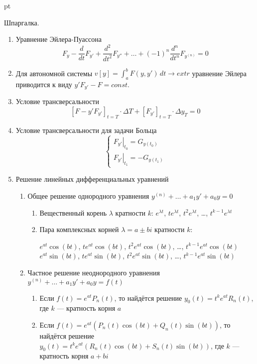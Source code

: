 \documentclass[pdftex,12pt,a4paper]{article}
\begin{document}
 pt %

Шпаргалка.

\begin{enumerate}
\item Уравнение Эйлера-Пуассона
\[
F_y-\frac{d}{dt}F_{y'}+\frac{d^2}{dt^2}F_{y''}+\ldots+(-1)^n\frac{d^n}{dt^n}F_{y^{(n)}}=0
\]

\item Для автономной системы $v[y]=\int_a^b F(y,y')\, dt \to extr$ уравнение Эйлера приводится к виду $y'F_{y'}-F=const$.

\item Условие трансверсальности 
\[
[F-y'F_{y'}]_{t=T}\cdot \Delta T + [F_{y'}]_{t=T}\cdot \Delta y_T=0
\]

\item Условие трансверсальности для задачи Больца
\[
\begin{cases}
\left. F_{y'}\right|_{t_0}=G_{y(t_0)} \\
\left. F_{y'}\right|_{t_1}=-G_{y(t_1)}
\end{cases}
\]

\item Решение линейных дифференциальных уравнений

\begin{enumerate}
\item Общее решение однородного уравнения $y^{(n)}+\ldots+a_1 y'+a_0 y=0$
\begin{enumerate}
\item Вещественный корень $\lambda$ кратности $k$: $e^{\lambda t}$, $te^{\lambda t}$, $t^2e^{\lambda t}$, \ldots, $t^{k-1}e^{\lambda t}$
\item Пара комплексных корней $\lambda=a\pm bi$  кратности $k$:

$e^{at}\cos(bt)$, $te^{at}\cos(bt)$, $t^2e^{at}\cos(bt)$, \ldots, $t^{k-1}e^{at}\cos(bt)$ \\
$e^{at}\sin(bt)$, $te^{at}\sin(bt)$, $t^2e^{at}\sin(bt)$, \ldots, $t^{k-1}e^{at}\sin(bt)$
\end{enumerate}
\item Частное решение неоднородного уравнения $y^{(n)}+\ldots+a_1 y'+a_0 y=f(t)$
\begin{enumerate}
\item Если $f(t)=e^{at}P_n(t)$, то найдётся решение $y_0(t)=t^k e^{at} R_n(t)$, где $k$ --- кратность корня $a$
\item Если $f(t)=e^{at}(P_n(t)\cos(bt)+Q_n(t)\sin(bt))$, то найдётся решение $y_0(t)=t^k e^{at}(R_n(t)\cos(bt)+S_n(t)\sin(bt))$, где $k$ --- кратность корня $a+bi$
\end{enumerate}
\end{enumerate}

\end{enumerate}
\end{document}
